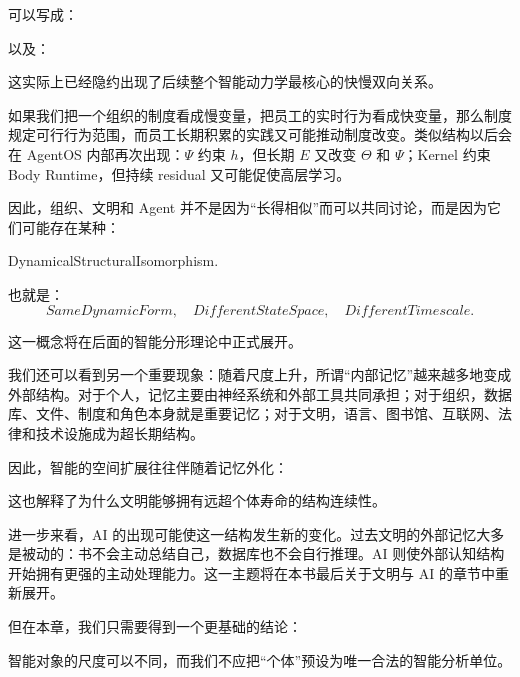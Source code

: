 可以写成：
\begin{statementbox}
\centering
{}
\end{statementbox}
以及：
\begin{statementbox}
\centering
{}
\end{statementbox}

这实际上已经隐约出现了后续整个智能动力学最核心的快慢双向关系。

如果我们把一个组织的制度看成慢变量，把员工的实时行为看成快变量，那么制度规定可行行为范围，而员工长期积累的实践又可能推动制度改变。类似结构以后会在 AgentOS 内部再次出现：\(\Psi\) 约束 \(h\)，但长期 \(E\) 又改变 \(\Theta\) 和 \(\Psi\)；Kernel 约束 Body Runtime，但持续 residual 又可能促使高层学习。

因此，组织、文明和 Agent 并不是因为“长得相似”而可以共同讨论，而是因为它们可能存在某种：
\begin{statementbox}
DynamicalStructuralIsomorphism.
\end{statementbox}

也就是：
\[
SameDynamicForm,
\quad
DifferentStateSpace,
\quad
DifferentTimescale.
\]

这一概念将在后面的智能分形理论中正式展开。

我们还可以看到另一个重要现象：随着尺度上升，所谓“内部记忆”越来越多地变成外部结构。对于个人，记忆主要由神经系统和外部工具共同承担；对于组织，数据库、文件、制度和角色本身就是重要记忆；对于文明，语言、图书馆、互联网、法律和技术设施成为超长期结构。

因此，智能的空间扩展往往伴随着记忆外化：
\begin{statementbox}
\centering
{}
\end{statementbox}

这也解释了为什么文明能够拥有远超个体寿命的结构连续性。

进一步来看，AI 的出现可能使这一结构发生新的变化。过去文明的外部记忆大多是被动的：书不会主动总结自己，数据库也不会自行推理。AI 则使外部认知结构开始拥有更强的主动处理能力。这一主题将在本书最后关于文明与 AI 的章节中重新展开。

但在本章，我们只需要得到一个更基础的结论：

\begin{conclusion}
智能对象的尺度可以不同，而我们不应把“个体”预设为唯一合法的智能分析单位。
\end{conclusion}


